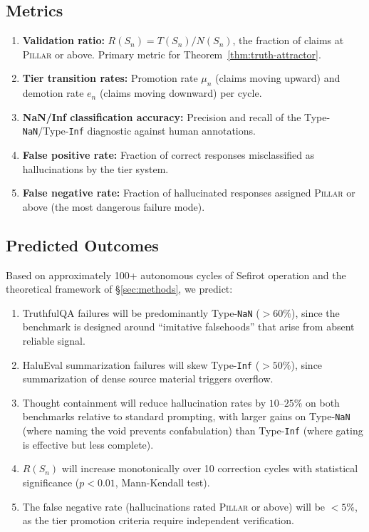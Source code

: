 \documentclass[11pt]{article}
\theoremstyle{definition}
\theoremstyle{remark}
\newcommand{\NaN}{\texttt{NaN}}
\newcommand{\Inf}{\texttt{Inf}}
\newcommand{\PILLAR}{\textsc{Pillar}}
\begin{document}
\subsection{Metrics}
\label{sec:metrics-formal}

\begin{enumerate}
  \item \textbf{Validation ratio:} $R(S_n) = T(S_n)/N(S_n)$, the fraction
    of claims at \PILLAR{} or above.  Primary metric for
    Theorem~\ref{thm:truth-attractor}.
  \item \textbf{Tier transition rates:} Promotion rate $\mu_n$ (claims
    moving upward) and demotion rate $e_n$ (claims moving downward) per cycle.
  \item \textbf{NaN/Inf classification accuracy:} Precision and recall of the
    Type-\NaN{}/Type-\Inf{} diagnostic against human annotations.
  \item \textbf{False positive rate:} Fraction of correct responses
    misclassified as hallucinations by the tier system.
  \item \textbf{False negative rate:} Fraction of hallucinated responses
    assigned \PILLAR{} or above (the most dangerous failure mode).
\end{enumerate}

\subsection{Predicted Outcomes}
\label{sec:predicted-outcomes}

Based on approximately 100+ autonomous cycles of Sefirot operation and the
theoretical framework of \S\ref{sec:methods}, we predict:

\begin{enumerate}
  \item TruthfulQA failures will be predominantly Type-\NaN{} ($>60\%$),
    since the benchmark is designed around ``imitative falsehoods'' that
    arise from absent reliable signal.
  \item HaluEval summarization failures will skew Type-\Inf{} ($>50\%$),
    since summarization of dense source material triggers overflow.
  \item Thought containment will reduce hallucination rates by $10$--$25\%$
    on both benchmarks relative to standard prompting, with larger gains
    on Type-\NaN{} (where naming the void prevents confabulation) than
    Type-\Inf{} (where gating is effective but less complete).
  \item $R(S_n)$ will increase monotonically over 10 correction cycles
    with statistical significance ($p < 0.01$, Mann-Kendall test).
  \item The false negative rate (hallucinations rated \PILLAR{} or above)
    will be $< 5\%$, as the tier promotion criteria require independent
    verification.
\end{enumerate}
\end{document}
